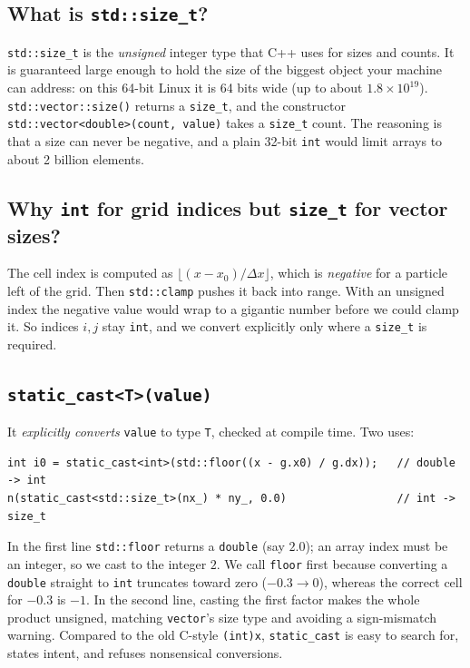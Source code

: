 \documentclass[11pt,a4paper]{article}
\begin{document}
\subsection{What is \texttt{std::size\_t}?}
\texttt{std::size\_t} is the \emph{unsigned} integer type that C++ uses for sizes and counts. It is
guaranteed large enough to hold the size of the biggest object your machine can address: on this
64-bit Linux it is 64 bits wide (up to about $1.8\times10^{19}$). \texttt{std::vector::size()} returns a
\texttt{size\_t}, and the constructor \lstinline|std::vector<double>(count, value)| takes a
\texttt{size\_t} count. The reasoning is that a size can never be negative, and a plain 32-bit
\texttt{int} would limit arrays to about 2 billion elements.

\subsection{Why \texttt{int} for grid indices but \texttt{size\_t} for vector sizes?}
The cell index is computed as $\lfloor (x-x_0)/\Delta x\rfloor$, which is \emph{negative} for a particle
left of the grid. Then \texttt{std::clamp} pushes it back into range. With an unsigned index the negative
value would wrap to a gigantic number before we could clamp it. So indices $i,j$ stay \texttt{int}, and we
convert explicitly only where a \texttt{size\_t} is required.

\subsection{\texttt{static\_cast<T>(value)}}
It \emph{explicitly converts} \texttt{value} to type \texttt{T}, checked at compile time. Two uses:
\begin{lstlisting}
int i0 = static_cast<int>(std::floor((x - g.x0) / g.dx));   // double -> int
n(static_cast<std::size_t>(nx_) * ny_, 0.0)                 // int -> size_t
\end{lstlisting}
In the first line \texttt{std::floor} returns a \texttt{double} (say $2.0$); an array index must be an
integer, so we cast to the integer $2$. We call \texttt{floor} first because converting a
\texttt{double} straight to \texttt{int} truncates toward zero ($-0.3\to0$), whereas the correct cell
for $-0.3$ is $-1$. In the second line, casting the first factor makes the whole product unsigned,
matching \texttt{vector}'s size type and avoiding a sign-mismatch warning. Compared to the old C-style
\lstinline|(int)x|, \texttt{static\_cast} is easy to search for, states intent, and refuses nonsensical
conversions.
\end{document}
